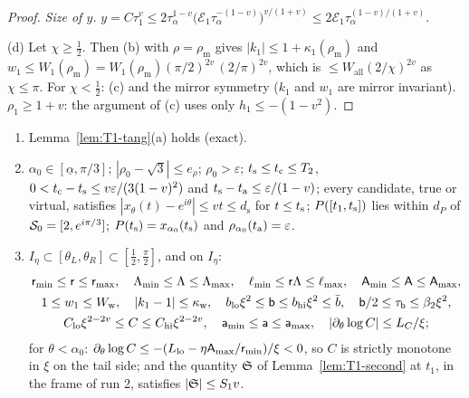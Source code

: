 \begin{proof}
\emph{Size of $y$.} $y=C\tau_1^v\le2\tau_\alpha^{1-v}\bigl(\mathcal E_1\tau_\alpha^{-(1-v)}\bigr)^{v/(1+v)}\le2\mathcal E_1
\tau_\alpha^{(1-v)/(1+v)}$.

(d) Let $\chi\ge\frac12$. Then (b) with $\rho=\rho_{\mathrm m}$ gives $|k_1|\le1+\kappa_1(\rho_{\mathrm m})$ and
$w_1\le W_1(\rho_{\mathrm m})=W_1(\rho_{\mathrm m})(\pi/2)^{2v}\,(2/\pi)^{2v}$, which is $\le W_{\mathrm{all}}(2/\chi)^{2v}$ as
$\chi\le\pi$. For $\chi<\frac12$:
(c) and the mirror symmetry ($k_1$ and $w_1$ are mirror invariant). $\rho_1\ge1+v$: the argument of (c) uses only
$h_1\le-(1-v^2)$.
\end{proof}

\begin{lemma}\label{lem:HTp-tang}
\begin{enumerate}
\item[(a)] Lemma~\ref{lem:T1-tang}(a) holds (exact).
\item[(b)] $\alpha_0\in[\underline\alpha,\pi/3]$; $|\rho_0-\sqrt3|\le e_\rho$; $\rho_0>\varepsilon$; $t_{\mathrm s}\le t_{\mathrm c}\le T_2$,
$0<t_{\mathrm c}-t_{\mathrm s}\le v\varepsilon/(3(1-v)^2)$ and $t_{\mathrm s}-t_{\mathrm a}\le\varepsilon/(1-v)$; every candidate, true or virtual, satisfies
$|x_\theta(t)-e^{i\theta}|\le vt\le d_{\mathrm s}$ for $t\le t_{\mathrm s}$; $P([t_1,t_{\mathrm s}])$ lies within $d_P$ of $\mathcal S_0=[2,e^{i\pi/3}]$;
$P(t_{\mathrm s})=x_{\alpha_0}(t_{\mathrm s})$ and $\rho_{\alpha_0}(t_{\mathrm a})=\varepsilon$.
\item[(c)] $I_\eta\subset[\theta_L,\theta_R]\subset[\frac12,\frac\pi2]$, and on $I_\eta$:
\begin{gather*}
\mathsf r_{\min}\le\mathsf r\le\mathsf r_{\max},\quad\Lambda_{\min}\le\Lambda\le\Lambda_{\max},\quad\ell_{\min}\le\mathsf r\Lambda\le\ell_{\max},\quad
\mathsf A_{\min}\le\mathsf A\le\mathsf A_{\max},\\
1\le w_1\le W_{\mathrm w},\quad|k_1-1|\le\kappa_{\mathrm w},\quad b_{\mathrm{lo}}\xi^2\le\mathsf b\le b_{\mathrm{hi}}\xi^2\le\bar b,\quad
\mathsf b/2\le\tau_{\mathsf b}\le\beta_2\xi^2,\\
C_{\mathrm{lo}}\xi^{2-2v}\le C\le C_{\mathrm{hi}}\xi^{2-2v},\quad\mathsf a_{\min}\le\mathsf a\le\mathsf a_{\max},\quad
|\partial_\theta\log C|\le L_C/\xi;
\end{gather*}
for $\theta<\alpha_0$: $\partial_\theta\log C\le-(L_{\mathrm{lo}}-\eta\mathsf A_{\max}/\mathsf r_{\min})/\xi<0$, so $C$ is strictly monotone in $\xi$ on
the tail side; and the quantity $\mathfrak S$ of Lemma~\ref{lem:T1-second} at $t_1$, in the frame of run 2, satisfies $|\mathfrak S|\le S_1v$.
\end{enumerate}
\end{lemma}
